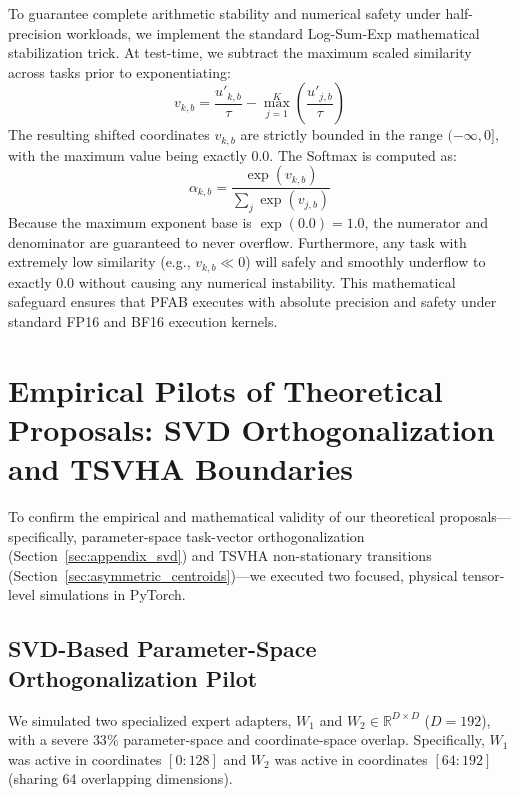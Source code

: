 \documentclass{article}
\theoremstyle{plain}
\theoremstyle{definition}
\theoremstyle{remark}
\begin{document}
To guarantee complete arithmetic stability and numerical safety under half-precision workloads, we implement the standard Log-Sum-Exp mathematical stabilization trick. At test-time, we subtract the maximum scaled similarity across tasks prior to exponentiating:
\begin{equation}
  v_{k, b} = \frac{u'_{k, b}}{\tau} - \max_{j=1}^K \left( \frac{u'_{j, b}}{\tau} \right)
\end{equation}
The resulting shifted coordinates $v_{k, b}$ are strictly bounded in the range $(-\infty, 0]$, with the maximum value being exactly $0.0$. The Softmax is computed as:
\begin{equation}
  \alpha_{k, b} = \frac{\exp(v_{k, b})}{\sum_j \exp(v_{j, b})}
\end{equation}
Because the maximum exponent base is $\exp(0.0) = 1.0$, the numerator and denominator are guaranteed to never overflow. Furthermore, any task with extremely low similarity (e.g., $v_{k, b} \ll 0$) will safely and smoothly underflow to exactly $0.0$ without causing any numerical instability. This mathematical safeguard ensures that PFAB executes with absolute precision and safety under standard FP16 and BF16 execution kernels.

\section{Empirical Pilots of Theoretical Proposals: SVD Orthogonalization and TSVHA Boundaries}
\label{app:rigor_pilots}

To confirm the empirical and mathematical validity of our theoretical proposals—specifically, parameter-space task-vector orthogonalization (Section~\ref{sec:appendix_svd}) and TSVHA non-stationary transitions (Section~\ref{sec:asymmetric_centroids})—we executed two focused, physical tensor-level simulations in PyTorch.

\subsection{SVD-Based Parameter-Space Orthogonalization Pilot}
We simulated two specialized expert adapters, $W_1$ and $W_2 \in \mathbb{R}^{D \times D}$ ($D=192$), with a severe $33\%$ parameter-space and coordinate-space overlap. Specifically, $W_1$ was active in coordinates $[0:128]$ and $W_2$ was active in coordinates $[64:192]$ (sharing 64 overlapping dimensions). 
\end{document}
